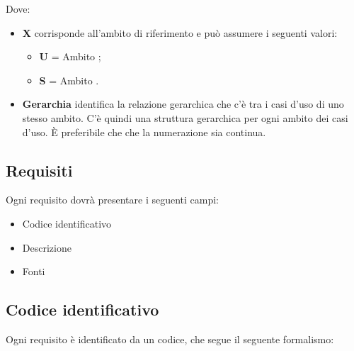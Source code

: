 Dove:
\begin{itemize}
 \item \textbf{X} corrisponde all'ambito di riferimento e può assumere i seguenti valori:
	\begin{itemize}
	 \item[] \textbf{U} = Ambito ;
	 \item[] \textbf{S} = Ambito .
	\end{itemize}

	 \item \textbf{Gerarchia} identifica la relazione gerarchica che c'è tra i casi d'uso di uno stesso ambito. C'è quindi una struttura gerarchica per ogni ambito dei casi d'uso. È preferibile che che la numerazione sia continua.
\end{itemize}

\subsection{Requisiti}

Ogni requisito dovrà presentare i seguenti campi:
\begin{itemize}
 \item Codice identificativo
 \item Descrizione
 \item Fonti
\end{itemize}

\subsection{Codice identificativo}

Ogni requisito è identificato da un codice, che segue il seguente formalismo:
\begin{center}
\end{center}

